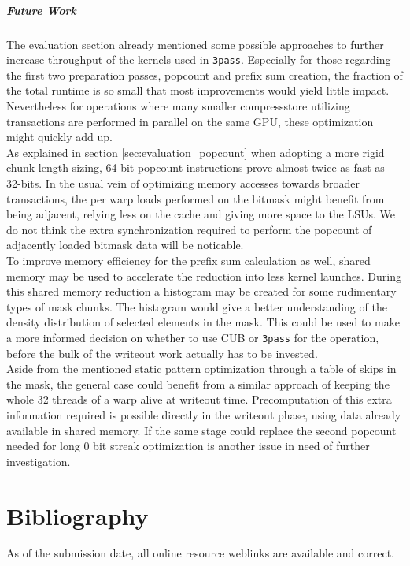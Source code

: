 \documentclass{tudscrreprt}
\begin{document}
		\paragraph{Future Work} The evaluation section already mentioned some possible approaches to further increase throughput of the kernels used in \texttt{3pass}. Especially for those regarding the first two preparation passes, popcount and prefix sum creation, the fraction of the total runtime is so small that most improvements would yield little impact. Nevertheless for operations where many smaller compressstore utilizing transactions are performed in parallel on the same GPU, these optimization might quickly add up. \\
		As explained in section \ref{sec:evaluation_popcount} when adopting a more rigid chunk length sizing, 64-bit popcount instructions prove almost twice as fast as 32-bits. In the usual vein of optimizing memory accesses towards broader transactions, the per warp loads performed on the bitmask might benefit from being adjacent, relying less on the cache and giving more space to the LSUs. We do not think the extra synchronization required to perform the popcount of adjacently loaded bitmask data will be noticable. \\
		To improve memory efficiency for the prefix sum calculation as well, shared memory may be used to accelerate the reduction into less kernel launches. During this shared memory reduction a histogram may be created for some rudimentary types of mask chunks. The histogram would give a better understanding of the density distribution of selected elements in the mask. This could be used to make a more informed decision on whether to use CUB or \texttt{3pass} for the operation, before the bulk of the writeout work actually has to be invested. \\
		Aside from the mentioned static pattern optimization through a table of skips in the mask, the general case could benefit from a similar approach of keeping the whole 32 threads of a warp alive at writeout time. Precomputation of this extra information required is possible directly in the writeout phase, using data already available in shared memory. If the same stage could replace the second popcount needed for long 0 bit streak optimization is another issue in need of further investigation. \\
		
	\chapter{Bibliography}
		As of the submission date, all online resource weblinks are available and correct.
		\printbibliography[heading=none]
	
\end{document}
